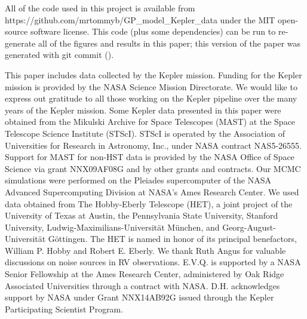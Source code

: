 \documentclass[apjl]{emulateapj}
\begin{document}
All of the code used in this project is available from
{https://github.com/mrtommyb/GP\_model\_Kepler\_data} under the MIT
open-source software license.
This code (plus some dependencies) can be run to re-generate all of the
figures and results in this paper; this version of the paper was generated
with git commit \texttt{\githash} (\gitdate).

\acknowledgments
This paper includes data collected by the Kepler mission. Funding for the Kepler mission is provided by the NASA Science Mission Directorate. We would like to express out gratitude to all those working on the Kepler pipeline over the many years of the Kepler mission. Some Kepler data presented in this paper were obtained from the Mikulski Archive for Space Telescopes (MAST) at the Space Telescope Science Institute (STScI). STScI is operated by the Association of Universities for Research in Astronomy, Inc., under NASA contract NAS5-26555. Support for MAST for non-HST data is provided by the NASA Office of Space Science via grant NNX09AF08G and by other grants and contracts. Our MCMC simulations were performed on the Pleiades supercomputer of the NASA Advanced Supercomputing Division at NASA's Ames Research Center. We used data obtained from The Hobby-Eberly Telescope (HET), a joint project of the University of Texas at Austin, the Pennsylvania State University, Stanford University, Ludwig-Maximilians-Universit\"{a}t M\"{u}nchen, and Georg-August-Universit\"{a}t G\"{o}ttingen. The HET is named in honor of its principal benefactors, William P. Hobby and Robert E. Eberly. We thank Ruth Angus for valuable discussions on noise sources in RV observations. E.V.Q. is supported by a NASA Senior Fellowship at the Ames Research Center, administered by Oak Ridge Associated Universities through a contract with NASA. D.H. acknowledges support by NASA under Grant NNX14AB92G issued through the Kepler Participating Scientist Program.






\end{document}
